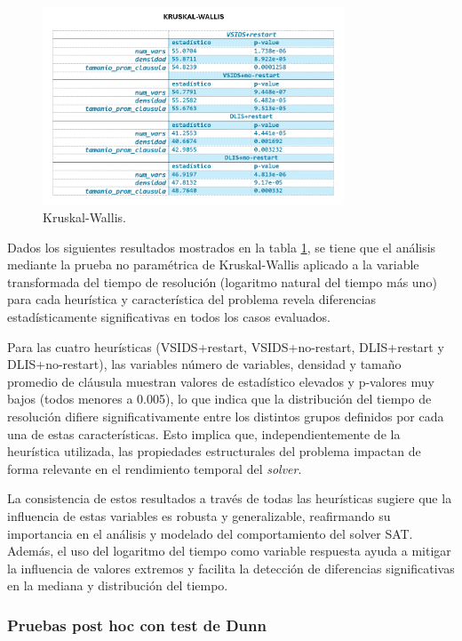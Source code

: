 \begin{figure}[ht]
    \centering
    \includegraphics[width=0.8\textwidth]{Graphics/kruskal_wallis.png}
    \caption{Kruskal-Wallis.}
    \label{fig:kruskal-wallis}
\end{figure}


Dados los siguientes resultados mostrados en la tabla \ref{fig:kruskal-wallis}, se tiene que el análisis mediante la prueba no paramétrica de Kruskal-Wallis aplicado a la variable transformada del tiempo de resolución (logaritmo natural del tiempo más uno) para cada heurística y característica del problema revela diferencias estadísticamente significativas en todos los casos evaluados.

Para las cuatro heurísticas (VSIDS+restart, VSIDS+no-restart, DLIS+restart y DLIS+no-restart), las variables número de variables, densidad y tamaño promedio de cláusula muestran valores de estadístico elevados y p-valores muy bajos (todos menores a 0.005), lo que indica que la distribución del tiempo de resolución difiere significativamente entre los distintos grupos definidos por cada una de estas características. Esto implica que, independientemente de la heurística utilizada, las propiedades estructurales del problema impactan de forma relevante en el rendimiento temporal del \textit{solver}.

La consistencia de estos resultados a través de todas las heurísticas sugiere que la influencia de estas variables es robusta y generalizable, reafirmando su importancia en el análisis y modelado del comportamiento del solver SAT. Además, el uso del logaritmo del tiempo como variable respuesta ayuda a mitigar la influencia de valores extremos y facilita la detección de diferencias significativas en la mediana y distribución del tiempo. 

\subsubsection{Pruebas post hoc con test de Dunn}

